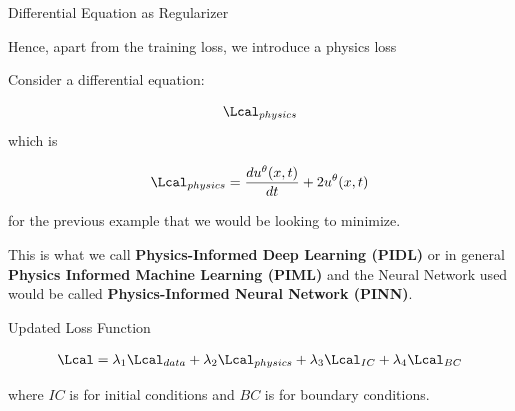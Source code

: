 \documentclass[aspectratio=169,xcolor=dvipsnames,svgnames,x11names,fleqn]{beamer}
\begin{document}
\begin{frame}{Differential Equation as Regularizer}

Hence, apart from the training loss, we introduce a physics loss


\begin{tcolorbox}[    enhanced,
    colback=androidRedLight,
    colframe=borderLine,
    arc=0pt, 
    boxrule=0.3pt,
    leftrule=3pt,
    borderline west={5pt}{0pt}{accentOrange}, 
    fontupper=\color{boxBackground},
    pad at break*=0mm,
    top=5pt, bottom=5pt, left=5pt, right=5pt]
    
   Consider a differential equation:
   

$$
\Lcal_{physics} 
$$
which is 

$$
\Lcal_{physics}  = \frac{d u^\theta(x, t)}{dt}  + 2u^\theta(x, t)
$$

for the previous example that we would be looking to minimize.
\end{tcolorbox}

\vspace{10pt}

\begin{center}
This is what we call \textbf{Physics-Informed Deep Learning (PIDL)} or in general \textbf{Physics Informed Machine Learning (PIML)} and the Neural Network used would be called \textbf{Physics-Informed Neural Network (PINN)}.
\end{center}

\end{frame}

\begin{frame}{Updated Loss Function}

\begin{align*}
\Lcal = \lambda_1\Lcal_{data} + \lambda_2 \Lcal_{physics} +  \lambda_3 \Lcal_{IC} + \lambda_4 \Lcal_{BC}
\end{align*}

where $IC$ is for initial conditions and $BC$ is for boundary conditions.

\end{frame}
\end{document}
